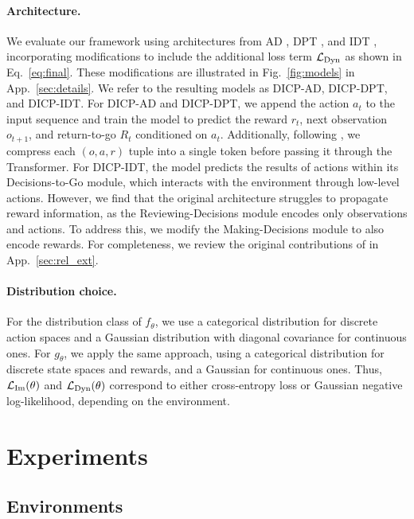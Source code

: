 \documentclass{article}
\begin{document}
\paragraph*{Architecture.}
We evaluate our framework using architectures from AD \citep{AD}, DPT \citep{DPT}, and IDT \citep{IDT}, incorporating modifications to include the additional loss term ${\mathcal{L}}_{\textrm{Dyn}}$ as shown in Eq.~\ref{eq:final}.
These modifications are illustrated in Fig.~\ref{fig:models} in App.~\ref{sec:details}.
We refer to the resulting models as DICP-AD, DICP-DPT, and DICP-IDT.
For DICP-AD and DICP-DPT, we append the action $a_t$ to the input sequence and train the model to predict the reward $r_t$, next observation $o_{t+1}$, and return-to-go $R_t$ conditioned on $a_t$.
Additionally, following \citet{DPT}, we compress each $(o, a, r)$ tuple into a single token before passing it through the Transformer.
For DICP-IDT, the model predicts the results of actions within its Decisions-to-Go module, which interacts with the environment through low-level actions.
However, we find that the original architecture struggles to propagate reward information, as the Reviewing-Decisions module encodes only observations and actions.
To address this, we modify the Making-Decisions module to also encode rewards.
For completeness, we review the original contributions of \citet{DPT, IDT} in App.~\ref{sec:rel_ext}.


\paragraph*{Distribution choice.}
For the distribution class of $f_\theta$, we use a categorical distribution for discrete action spaces and a Gaussian distribution with diagonal covariance for continuous ones.
For $g_\theta$, we apply the same approach, using a categorical distribution for discrete state spaces and rewards, and a Gaussian for continuous ones.
Thus, ${\mathcal{L}}_{\textrm{Im}}(\theta)$ and ${\mathcal{L}}_{\textrm{Dyn}}(\theta)$ correspond to either cross-entropy loss or Gaussian negative log-likelihood, depending on the environment.


\section{Experiments}
\label{sec:exp}

\subsection{Environments}
\end{document}
